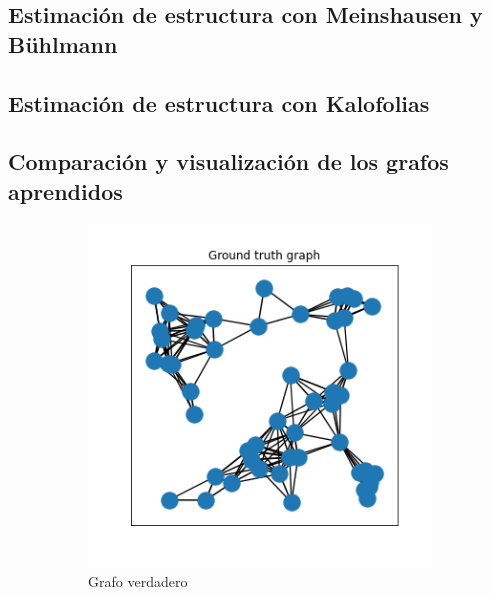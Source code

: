 \documentclass{article}
\begin{document}
\subsection{Estimación de estructura con Meinshausen y Bühlmann}



\subsection{Estimación de estructura con Kalofolias}


\subsection{Comparación y visualización de los grafos aprendidos}

\begin{figure}[htb]
    \centering
    \begin{subfigure}[t]{0.24\linewidth}
        \centering
        \includegraphics[width=\textwidth]{imagenes/generated_graph_syntetic/ground_truth_graph.png}
        \caption{Grafo verdadero}
    \end{subfigure}\hfill
    \begin{subfigure}[t]{0.24\linewidth}
        \centering

\end{subfigure}
\end{figure}
\end{document}

